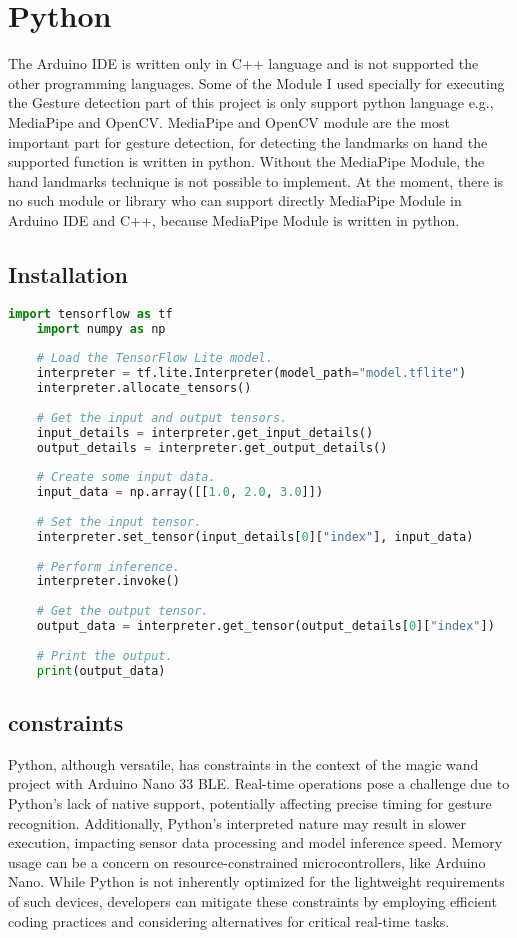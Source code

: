 \section{Python}
The Arduino IDE is written only in C++ language and is not supported the other programming languages. Some of the Module I used specially for executing the Gesture detection part of this project is only support python language e.g., MediaPipe and OpenCV. MediaPipe and OpenCV module are the most important part for gesture detection, for detecting the landmarks on hand the supported function is written in python. Without the MediaPipe Module, the hand landmarks technique is not possible to implement. At the moment, there is no such module or library who can support directly MediaPipe Module in Arduino IDE and C++, because MediaPipe Module is written in python.\cite{Alk:2019}
\subsection{Installation}
\label{Python}
\begin{lstlisting}[language=Python, caption={Load and Run TensorFlow Lite Model}, label={code:tflite-inference-python}, style=pythonstyle]
	import tensorflow as tf
	import numpy as np
	
	# Load the TensorFlow Lite model.
	interpreter = tf.lite.Interpreter(model_path="model.tflite")
	interpreter.allocate_tensors()
	
	# Get the input and output tensors.
	input_details = interpreter.get_input_details()
	output_details = interpreter.get_output_details()
	
	# Create some input data.
	input_data = np.array([[1.0, 2.0, 3.0]])
	
	# Set the input tensor.
	interpreter.set_tensor(input_details[0]["index"], input_data)
	
	# Perform inference.
	interpreter.invoke()
	
	# Get the output tensor.
	output_data = interpreter.get_tensor(output_details[0]["index"])
	
	# Print the output.
	print(output_data)
\end{lstlisting}

\subsection{constraints}
Python, although versatile, has constraints in the context of the magic wand project with Arduino Nano 33 BLE. Real-time operations pose a challenge due to Python's lack of native support, potentially affecting precise timing for gesture recognition. Additionally, Python's interpreted nature may result in slower execution, impacting sensor data processing and model inference speed. Memory usage can be a concern on resource-constrained microcontrollers, like Arduino Nano. While Python is not inherently optimized for the lightweight requirements of such devices, developers can mitigate these constraints by employing efficient coding practices and considering alternatives for critical real-time tasks.


